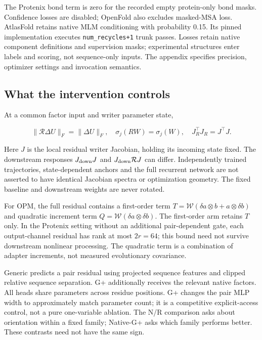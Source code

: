 

The Protenix bond term is zero for the recorded empty protein-only bond masks.
Confidence losses are disabled; OpenFold also excludes masked-MSA loss.
AtlasFold retains native MLM conditioning with probability 0.15. Its pinned
implementation executes \nolinkurl{num_recycles+1} trunk passes. Losses retain native
component definitions and supervision masks;
experimental structures enter labels and scoring, not sequence-only inputs.
The appendix specifies precision, optimizer settings and invocation semantics.

\subsection{What the intervention controls}\label{what-the-intervention-controls}

At a common factor input and writer parameter state,

\[
\|\mathcal R\Delta U\|_F=\|\Delta U\|_F,
\quad \sigma_j(RW)=\sigma_j(W),
\quad J_R^\top J_R=J^\top J.
\tag{2}
\]

Here \(J\) is the local residual writer Jacobian, holding its incoming state
fixed. The downstream responses \(J_{\rm down}J\) and
\(J_{\rm down}\mathcal R J\) can differ. Independently trained trajectories,
state-dependent anchors and the full recurrent network are not asserted to
have identical Jacobian spectra or optimization geometry. The fixed baseline
and downstream weights are never rotated.

For OPM, the full residual contains a first-order term
\(T=\mathcal W(\delta a\otimes b+a\otimes\delta b)\) and quadratic increment
term \(Q=\mathcal W(\delta a\otimes\delta b)\). The first-order arm retains
\(T\) only. In the Protenix setting without an additional pair-dependent gate,
each output-channel residual has rank at most \(2r=64\); this bound need not
survive downstream nonlinear processing. The quadratic term is a combination
of adapter increments, not measured evolutionary covariance.

Generic predicts a pair residual using projected sequence features and clipped
relative sequence separation. G+ additionally receives the relevant native
factors. All heads share parameters across residue positions. G+ changes the
pair MLP width to approximately match parameter count; it is a competitive
explicit-access control, not a pure one-variable ablation. The N/R comparison
asks about orientation within a fixed family; Native-G+ asks which family
performs better. These contrasts need not have the same sign.
